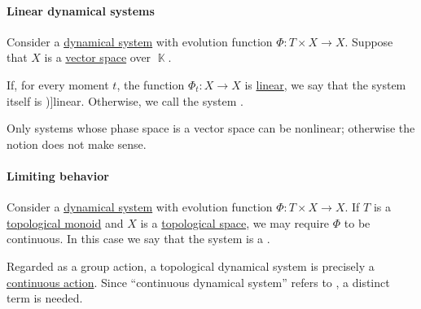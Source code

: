 \paragraph{Linear dynamical systems}

\begin{definition}\label{def:linear_dynamical_system}
  Consider a \hyperref[def:dynamical_system]{dynamical system} with evolution function \( \Phi: T \times X \to X \). Suppose that \( X \) is a \hyperref[def:vector_space]{vector space} over \( \BbbK \).

  If, for every moment \( t \), the function \( \Phi_t: X \to X \) is \hyperref[def:linear_function]{linear}, we say that the system itself is \term[ru=линейная (динамическая система) (\cite[11]{Юмагулов2015ДинамическиеСистемы})]{linear}. Otherwise, we call the system .
\end{definition}
\begin{comments}
  \item Only systems whose phase space is a vector space can be nonlinear; otherwise the notion does not make sense.
\end{comments}

\paragraph{Limiting behavior}

\begin{definition}\label{def:topological_dynamical_system}
  Consider a \hyperref[def:dynamical_system]{dynamical system} with evolution function \( \Phi: T \times X \to X \). If \( T \) is a \hyperref[def:topological_semigroup]{topological monoid} and \( X \) is a \hyperref[def:topological_space]{topological space}, we may require \( \Phi \) to be continuous. In this case we say that the system is a .
\end{definition}
\begin{comments}
  \item Regarded as a group action, a topological dynamical system is precisely a \hyperref[def:continuous_monoid_action]{continuous action}. Since \enquote{continuous dynamical system} refers to , a distinct term is needed.
\end{comments}

